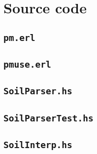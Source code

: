 
\section{Source code}

\subsection{\texttt{pm.erl}}


\subsection{\texttt{pmuse.erl}}


\subsection{\texttt{SoilParser.hs}}
\label{source:parser}


\subsection{\texttt{SoilParserTest.hs}}


\subsection{\texttt{SoilInterp.hs}}

